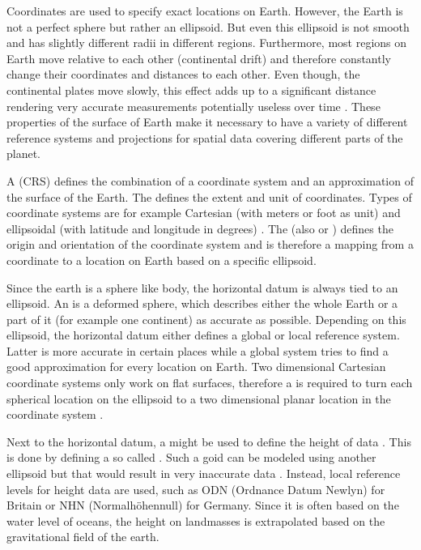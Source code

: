 		Coordinates are used to specify exact locations on Earth.
		However, the Earth is not a perfect sphere but rather an ellipsoid.
		But even this ellipsoid is not smooth and has slightly different radii in different regions.
		Furthermore, most regions on Earth move relative to each other (continental drift) and therefore constantly change their coordinates and distances to each other.
		Even though, the continental plates move slowly, this effect adds up to a significant distance rendering very accurate measurements potentially useless over time \cite[7]{ordenance-survey-booklet}.
		These properties of the surface of Earth make it necessary to have a variety of different reference systems and projections for spatial data covering different parts of the planet.
		
		A  (CRS) defines the combination of a coordinate system and an approximation of the surface of the Earth.
		The  defines the extent and unit of coordinates.
		Types of coordinate systems are for example Cartesian (with meters or foot as unit) and ellipsoidal (with latitude and longitude in degrees) \cite[11-13]{ordenance-survey-booklet}.
		The  (also  or ) defines the origin and orientation of the coordinate system and is therefore a mapping from a coordinate to a location on Earth based on a specific ellipsoid.
		
		Since the earth is a sphere like body, the horizontal datum is always tied to an ellipsoid.
		An  is a deformed sphere, which describes either the whole Earth or a part of it (for example one continent) as accurate as possible.
		Depending on this ellipsoid, the horizontal datum either defines a global or local reference system.
		Latter is more accurate in certain places while a global system tries to find a good approximation for every location on Earth.
		Two dimensional Cartesian coordinate systems only work on flat surfaces, therefore a  is required to turn each spherical location on the ellipsoid to a two dimensional planar location in the coordinate system \cite[17]{ordenance-survey-booklet}.
		
		Next to the horizontal datum, a  might be used to define the height of data \cite[9-10]{ordenance-survey-booklet}.
		This is done by defining a so called .
		Such a goid can be modeled using another ellipsoid but that would result in very inaccurate data \cite[10]{ordenance-survey-booklet}.
		Instead, local reference levels for height data are used, such as ODN (Ordnance Datum Newlyn) for Britain or NHN (Normalhöhennull) for Germany.
		Since it is often based on the water level of oceans, the height on landmasses is extrapolated based on the gravitational field of the earth.
		
